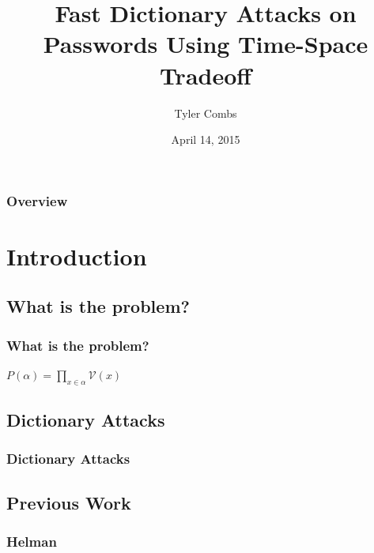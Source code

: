 \documentclass{beamer}
\title[Exit Exam]{Fast Dictionary Attacks on Passwords Using Time-Space Tradeoff} %
\author{Tyler Combs} %
\institute[OU] %
{
The University of Oklahoma \\ %
\medskip
\textit{tyler.combs@ou.edu} %
}
\date{April 14, 2015} %
\begin{document}
\begin{frame}
\titlepage %
\end{frame}

\begin{frame}
\frametitle{Overview} %
\tableofcontents %
\end{frame}


\section{Introduction} 
\subsection{What is the problem?}
\begin{frame}
\frametitle{What is the problem?}
$
P(\alpha) = \prod_{x \in \alpha} \mathcal{V}(x)
$
\end{frame}



\subsection{Dictionary Attacks}
\begin{frame}
\frametitle{Dictionary Attacks}
\end{frame}

\subsection{Previous Work}
\begin{frame}
\frametitle{Helman}
\end{frame}
\end{document}
